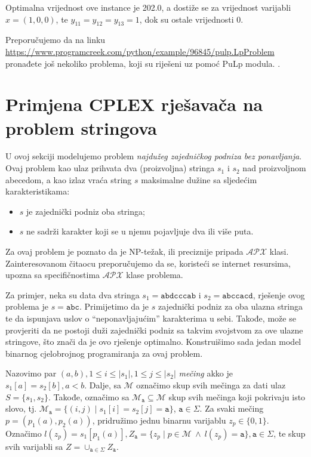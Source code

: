 \documentclass[a4paper, utf8, 11pt, colorlinks]{book}
\theoremstyle{definition}
\begin{document}
 Optimalna vrijednost ove instance je 202.0, a dostiže se za vrijednost varijabli $x = (1, 0, 0)$, te $y_{11}= y_{12}= y_{13} = 1$, dok su ostale vrijednosti 0.
 
Preporučujemo da na linku \url{https://www.programcreek.com/python/example/96845/pulp.LpProblem}
pronađete još nekoliko problema, koji su riješeni uz pomoć PuLp modula.
 . 
 \section{Primjena CPLEX rješavača na problem stringova}
 
 U ovoj sekciji modelujemo problem \emph{najdužeg zajedničkog podniza bez ponavljanja}. Ovaj problem kao ulaz prihvata dva (proizvoljna) stringa $s_1$ i $s_2$ nad proizvoljnom abecedom, a kao izlaz vraća string $s$ maksimalne dužine sa sljedećim karakteristikama:  
 \begin{itemize}
 	\item $s$ je zajednički podniz oba stringa; 
 	\item $s$ ne sadrži karakter koji se u njemu pojavljuje dva ili više puta.
 \end{itemize}
Za ovaj problem je poznato da je NP-težak, ili preciznije pripada $\mathcal{APX}$ klasi. Zainteresovanom čitaocu preporučujemo da se, koristeći se internet resursima, upozna sa specifičnostima $\mathcal{APX}$ klase problema.

Za primjer, neka su data dva stringa $s_1 = \texttt{abdcccab}$ i $s_2=\texttt{abccacd}$, rješenje ovog problema je $s=\texttt{abc}$. Primijetimo da je $s$ zajednički podniz za oba ulazna stringa te da ispunjava uslov o ``neponavljajućim'' karakterima u sebi. Takođe, može se provjeriti da ne postoji duži zajednički podniz sa takvim svojstvom za ove ulazne stringove, što znači da je ovo rješenje optimalno. Konstruišimo sada jedan model binarnog cjelobrojnog programiranja za ovaj problem. 

Nazovimo par $(a, b), 1 \leq i \leq |s_1|, 1 \leq j \leq |s_2|$ \emph{mečing} akko je $s_1[a]=s_2[b], a < b$. Dalje, sa $\mathcal{M}$ označimo skup svih mečinga za dati ulaz $S=\{s_1, s_2\}$. Takođe, označimo sa  $\mathcal{M}_{\texttt{a}} \subseteq \mathcal{M}$  skup svih mečinga koji pokrivaju isto slovo, tj. 
$\mathcal{M}_{\texttt{a}} = \{ (i, j) \mid s_1[i]=s_2[j]=\texttt{a}\}$, $\texttt{a} \in \Sigma$. Za svaki mečing $p=(p_1(a),p_2(a))$, pridružimo jednu binarnu varijablu $z_{p} \in \{0, 1\}$. Označimo $l(z_p)= s_1[ p_1(a) ], Z_{\texttt{a}} = \{ z_p \mid p \in \mathcal{M} \ \wedge\  l(z_p) = \texttt{a}\}, \texttt{a}\in \Sigma$, te skup svih varijabli sa $Z = \cup_{\texttt{a} \in \Sigma} Z_{\texttt{a}}$. 
\end{document}
